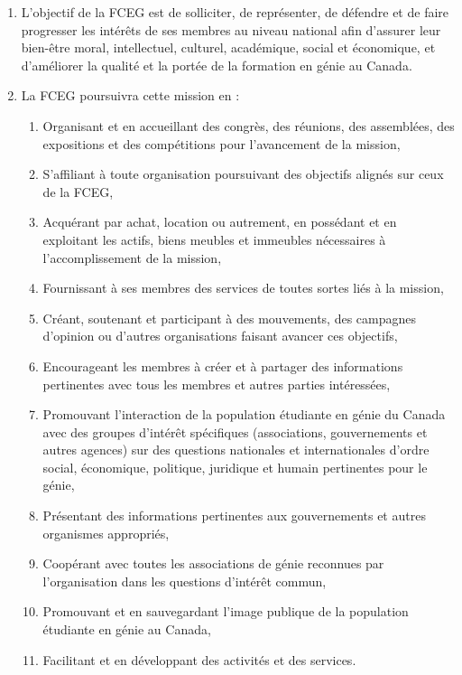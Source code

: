 \begin{enumerate}
 \item L'objectif de la FCEG est de solliciter, de représenter, de défendre et de faire progresser les intérêts de ses membres au niveau national afin d'assurer leur bien-être moral, intellectuel, culturel, académique, social et économique, et d'améliorer la qualité et la portée de la formation en génie au Canada.
 \item La FCEG poursuivra cette mission en :
  \begin{enumerate}
   \item Organisant et en accueillant des congrès, des réunions, des assemblées, des expositions et des compétitions pour l'avancement de la mission,
   \item S'affiliant à toute organisation poursuivant des objectifs alignés sur ceux de la FCEG,
   \item Acquérant par achat, location ou autrement, en possédant et en exploitant les actifs, biens meubles et immeubles nécessaires à l'accomplissement de la mission,
   \item Fournissant à ses membres des services de toutes sortes liés à la mission,
   \item Créant, soutenant et participant à des mouvements, des campagnes d'opinion ou d'autres organisations faisant avancer ces objectifs,
   \item Encourageant les membres à créer et à partager des informations pertinentes avec tous les membres et autres parties intéressées,
   \item Promouvant l'interaction de la population étudiante en génie du Canada avec des groupes d'intérêt spécifiques (associations, gouvernements et autres agences) sur des questions nationales et internationales d'ordre social, économique, politique, juridique et humain pertinentes pour le génie,
   \item Présentant des informations pertinentes aux gouvernements et autres organismes appropriés,
   \item Coopérant avec toutes les associations de génie reconnues par l'organisation dans les questions d'intérêt commun,
   \item Promouvant et en sauvegardant l'image publique de la population étudiante en génie au Canada,
   \item Facilitant et en développant des activités et des services.
  \end{enumerate}
\end{enumerate}

